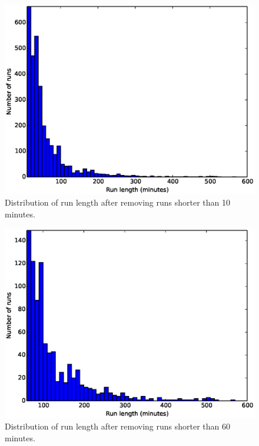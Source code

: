 \begin{figure}[!h]
  \centering
  \includegraphics[width=120mm]{images/hist10-600.eps}
  \caption{Distribution of run length after removing runs shorter than 10 minutes.}
  \label{fig:histogram10-600}
\end{figure}

\begin{figure}[!h]
  \centering
  \includegraphics[width=120mm]{images/hist60-600.eps}
  \caption{Distribution of run length after removing runs shorter than 60 minutes.}
  \label{fig:histogram60-600}
\end{figure}



